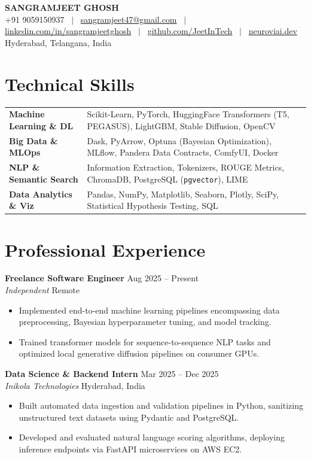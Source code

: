 \documentclass[10pt]{article}
\makeatletter
\newcommand{\resumeHeader}{
\begin{center}
{\LARGE \textbf{SANGRAMJEET GHOSH}} \\[3pt]
{\small
+91 9059150937 ~$|$~
\href{mailto:sangramjeet47@gmail.com}{sangramjeet47@gmail.com} ~$|$~
\href{https://www.linkedin.com/in/sangramjeetghosh}{linkedin.com/in/sangramjeetghosh} ~$|$~
\href{https://github.com/JeetInTech}{github.com/JeetInTech} ~$|$~
\href{https://neuroviai.dev}{neuroviai.dev}
}\\[1pt]
{\footnotesize Hyderabad, Telangana, India}
\end{center}
\vspace{-8pt}
}
\makeatother
\begin{document}
\resumeHeader

\section*{Technical Skills}
\begin{tabularx}{\textwidth}{@{}l X@{}}
\textbf{Machine Learning \& DL} & Scikit-Learn, PyTorch, HuggingFace Transformers (T5, PEGASUS), LightGBM, Stable Diffusion, OpenCV \\[1.5pt]
\textbf{Big Data \& MLOps} & Dask, PyArrow, Optuna (Bayesian Optimization), MLflow, Pandera Data Contracts, ComfyUI, Docker \\[1.5pt]
\textbf{NLP \& Semantic Search} & Information Extraction, Tokenizers, ROUGE Metrics, ChromaDB, PostgreSQL (\texttt{pgvector}), LIME \\[1.5pt]
\textbf{Data Analytics \& Viz} & Pandas, NumPy, Matplotlib, Seaborn, Plotly, SciPy, Statistical Hypothesis Testing, SQL \\
\end{tabularx}

\section*{Professional Experience}
\textbf{Freelance Software Engineer} \hfill Aug 2025 -- Present \\
\textit{Independent} \hfill Remote
\begin{itemize}
    \item Implemented end-to-end machine learning pipelines encompassing data preprocessing, Bayesian hyperparameter tuning, and model tracking.
    \item Trained transformer models for sequence-to-sequence NLP tasks and optimized local generative diffusion pipelines on consumer GPUs.
\end{itemize}

\vspace{1.5pt}
\textbf{Data Science \& Backend Intern} \hfill Mar 2025 -- Dec 2025 \\
\textit{Inikola Technologies} \hfill Hyderabad, India
\begin{itemize}
    \item Built automated data ingestion and validation pipelines in Python, sanitizing unstructured text datasets using Pydantic and PostgreSQL.
    \item Developed and evaluated natural language scoring algorithms, deploying inference endpoints via FastAPI microservices on AWS EC2.
\end{itemize}
\end{document}
